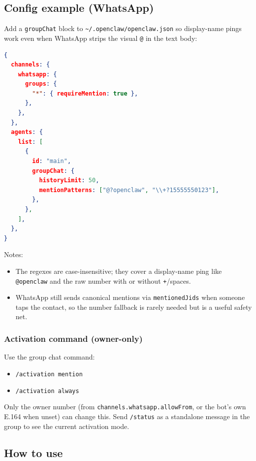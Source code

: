 \subsection{Config example (WhatsApp)}


Add a \texttt{groupChat} block to \texttt{\textasciitilde{}/.openclaw/openclaw.json} so display-name pings work even when WhatsApp strips the visual \texttt{@} in the text body:

\begin{lstlisting}[language=json]
{
  channels: {
    whatsapp: {
      groups: {
        "*": { requireMention: true },
      },
    },
  },
  agents: {
    list: [
      {
        id: "main",
        groupChat: {
          historyLimit: 50,
          mentionPatterns: ["@?openclaw", "\\+?15555550123"],
        },
      },
    ],
  },
}
\end{lstlisting}


Notes:

\begin{itemize}
  \item The regexes are case-insensitive; they cover a display-name ping like \texttt{@openclaw} and the raw number with or without \texttt{+}/spaces.
  \item WhatsApp still sends canonical mentions via \texttt{mentionedJids} when someone taps the contact, so the number fallback is rarely needed but is a useful safety net.
\end{itemize}


\subsubsection{Activation command (owner-only)}


Use the group chat command:

\begin{itemize}
  \item \texttt{/activation mention}
  \item \texttt{/activation always}
\end{itemize}


Only the owner number (from \texttt{channels.whatsapp.allowFrom}, or the bot’s own E.164 when unset) can change this. Send \texttt{/status} as a standalone message in the group to see the current activation mode.

\subsection{How to use}


